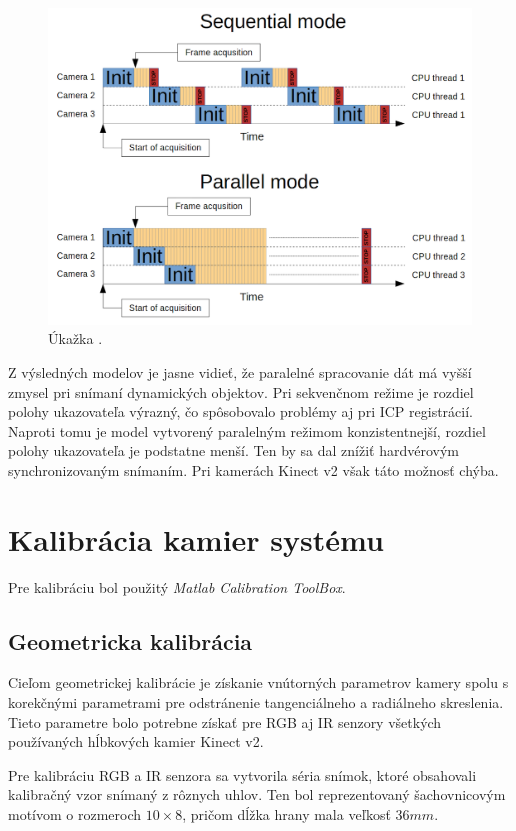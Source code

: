 \begin{figure}[H]
	\centering
	\includegraphics[width=\textwidth]{figures/scanning_mode.png}
	\caption{Úkažka .}
	\label{fig:multicam:models}
\end{figure}

Z výsledných modelov je jasne vidieť, že paralelné spracovanie dát má vyšší zmysel pri snímaní dynamických objektov. Pri sekvenčnom režime je rozdiel polohy ukazovateľa výrazný, čo spôsobovalo problémy aj pri ICP registrácií. Naproti tomu je model vytvorený paralelným režimom konzistentnejší, rozdiel polohy ukazovateľa je podstatne menší. Ten by sa dal znížiť hardvérovým synchronizovaným snímaním. Pri kamerách Kinect v2 však táto možnosť chýba.

\section{Kalibrácia kamier systému}
\label{sec:kinect_calib}
Pre kalibráciu bol použitý \textit{Matlab Calibration ToolBox}. 

\subsection{Geometricka kalibrácia}
Cieľom geometrickej kalibrácie je získanie vnútorných parametrov  kamery spolu s korekčnými parametrami pre odstránenie tangenciálneho a radiálneho skreslenia. Tieto parametre bolo potrebne získať pre RGB aj IR senzory všetkých používaných hĺbkových kamier Kinect v2. 

Pre kalibráciu RGB a IR senzora sa vytvorila séria snímok, ktoré  obsahovali kalibračný vzor snímaný z rôznych uhlov. Ten bol reprezentovaný šachovnicovým motívom o rozmeroch $10\times8$, pričom dĺžka hrany mala veľkosť $36mm$.


